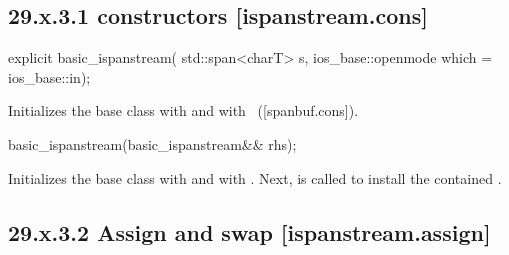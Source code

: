 \documentclass[ebook,11pt,article]{memoir}
\renewcommand{\iref}[1]{[#1]}
\begin{document}

\subsection{29.x.3.1  constructors [ispanstream.cons]}
\label{ispanstream.cons}

\begin{itemdecl}
explicit basic_ispanstream(
  std::span<charT> s,
  ios_base::openmode which = ios_base::in);
\end{itemdecl}

\begin{itemdescr}
\pnum
\effects
Initializes the base class with
and  with
~(\iref{spanbuf.cons}).
\end{itemdescr}

\begin{itemdecl}
basic_ispanstream(basic_ispanstream&& rhs);
\end{itemdecl}

\begin{itemdescr}
\pnum
\effects 
Initializes the base class with  
and  with .
Next,  is called to
install the contained .
\end{itemdescr}

\subsection{29.x.3.2 Assign and swap [ispanstream.assign]}
\label{ispanstream.assign}
\end{document}
